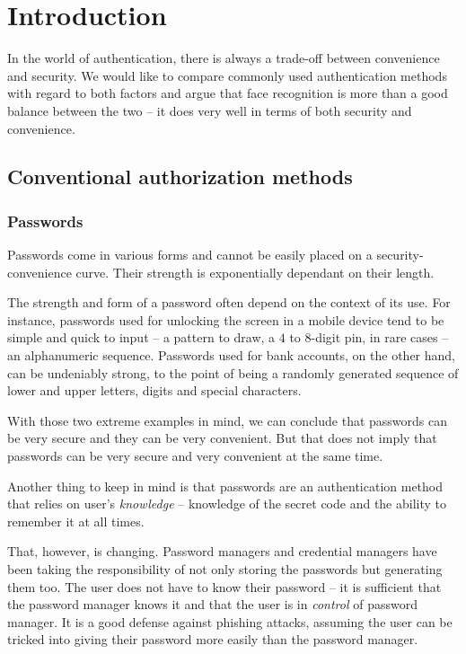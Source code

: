 \chapter{Introduction}
    In the world of authentication, there is always a trade-off between
    convenience and security. We would like to compare commonly used authentication
    methods with regard to both factors and argue that face recognition is more than
    a good balance between the two -- it does very well in terms of both security
    and convenience.

    \section{Conventional authorization methods}
        \subsection*{Passwords}
            Passwords come in various forms and cannot be easily placed on a
            security-convenience curve. Their strength is exponentially dependant
            on their length.

            The strength and form of a password often depend on the context of its
            use. For instance, passwords used for unlocking the screen in a mobile
            device tend to be simple and quick to input -- a pattern to draw, a
            $4$ to $8$-digit pin, in rare cases -- an alphanumeric sequence.
            Passwords used for bank accounts, on the other hand, can be undeniably
            strong, to the point of being a randomly generated sequence of lower
            and upper letters, digits and special characters.

            With those two extreme examples in mind, we can conclude that passwords
            can be very secure and they can be very convenient. But that does not
            imply that passwords can be very secure and very convenient at the
            same time.

            Another thing to keep in mind is that passwords are an authentication
            method that relies on user's \textit{knowledge} -- knowledge of the
            secret code and the ability to remember it at all times.

            That, however, is changing. Password managers and credential managers have been taking
            the responsibility of not only storing the passwords but generating
            them too. The user does not have to know their password -- it is sufficient
            that the password manager knows it and that the user is in \textit{control}
            of password manager. It is a good defense against phishing attacks,
            assuming the user can be tricked into giving their password more
            easily than the password manager.


